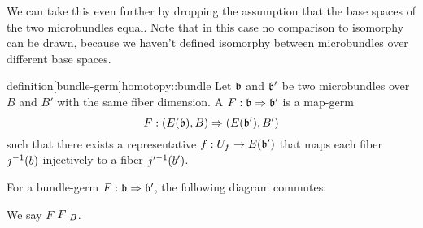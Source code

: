 \begin{myparagraph}
    We can take this even further by dropping the assumption
    that the base spaces of the two microbundles equal.
    Note that in this case no comparison to isomorphy can be drawn,
    because we haven't defined isomorphy between microbundles over different base spaces.
\end{myparagraph}

\begin{mystatement}{definition}[bundle-germ]{homotopy::bundle}
    Let $\bb$ and $\bb'$ be two microbundles over $B$ and $B'$
    with the same fiber dimension.
    A  $\germdef{F}{\bb}{\bb'}$ is a map-germ
    \[ \germdef{F}{(E(\bb), B)}{(E(\bb'), B')} \]
    such that there exists a representative $f: U_f \to E(\bb')$
    that maps each fiber $j^{-1}(b)$ injectively to a fiber $j'^{-1}(b')$.
\end{mystatement}

\begin{myparagraph}
    For a bundle-germ $\germdef{F}{\bb}{\bb'}$, the following diagram commutes:
    \begin{center}
    \end{center}
    We say $F$  $F\vert_{B}$.
\end{myparagraph}